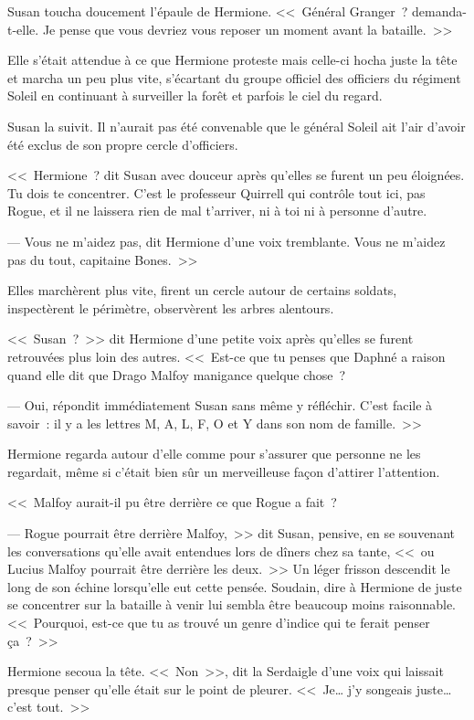 Susan toucha doucement l'épaule de Hermione. <<~Général Granger~? demanda-t-elle. Je pense que vous devriez vous reposer un moment avant la bataille.~>>

Elle s'était attendue à ce que Hermione proteste mais celle-ci hocha juste la tête et marcha un peu plus vite, s'écartant du groupe officiel des officiers du régiment Soleil en continuant à surveiller la forêt et parfois le ciel du regard.

Susan la suivit. Il n'aurait pas été convenable que le général Soleil ait l'air d'avoir été exclus de son propre cercle d'officiers.

<<~Hermione~? dit Susan avec douceur après qu'elles se furent un peu éloignées. Tu dois te concentrer. C'est le professeur Quirrell qui contrôle tout ici, pas Rogue, et il ne laissera rien de mal t'arriver, ni à toi ni à personne d'autre.

--- Vous ne m'aidez pas, dit Hermione d'une voix tremblante. Vous ne m'aidez pas du tout, capitaine Bones.~>>

Elles marchèrent plus vite, firent un cercle autour de certains soldats, inspectèrent le périmètre, observèrent les arbres alentours.

<<~Susan~?~>> dit Hermione d'une petite voix après qu'elles se furent retrouvées plus loin des autres. <<~Est-ce que tu penses que Daphné a raison quand elle dit que Drago Malfoy manigance quelque chose~?

--- Oui, répondit immédiatement Susan sans même y réfléchir. C'est facile à savoir~: il y a les lettres M, A, L, F, O et Y dans son nom de famille.~>>

Hermione regarda autour d'elle comme pour s'assurer que personne ne les regardait, même si c'était bien sûr un merveilleuse façon d'attirer l'attention.

<<~Malfoy aurait-il pu être derrière ce que Rogue a fait~?

--- Rogue pourrait être derrière Malfoy,~>> dit Susan, pensive, en se souvenant les conversations qu'elle avait entendues lors de dîners chez sa tante, <<~ou Lucius Malfoy pourrait être derrière les deux.~>> Un léger frisson descendit le long de son échine lorsqu'elle eut cette pensée. Soudain, dire à Hermione de juste se concentrer sur la bataille à venir lui sembla être beaucoup moins raisonnable. <<~Pourquoi, est-ce que tu as trouvé un genre d'indice qui te ferait penser ça~?~>>

Hermione secoua la tête. <<~Non~>>, dit la Serdaigle d'une voix qui laissait presque penser qu'elle était sur le point de pleurer. <<~Je… j'y songeais juste… c'est tout.~>>

